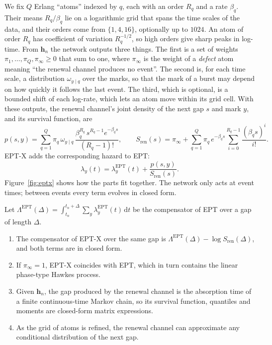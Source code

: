 We fix $Q$ Erlang ``atoms'' indexed by $q$, each with an order $R_q$ and a rate $\beta_q$. Their means
$R_q/\beta_q$ lie on a logarithmic grid that spans the time scales of the data, and their orders
come from $\{1,4,16\}$, optionally up to $1024$. An atom of order $R_q$ has coefficient of variation
$R_q^{-1/2}$, so high orders give sharp peaks in log-time. From $\bm h_n$ the network outputs
three things. The first is a set of weights $\pi_1,\dots,\pi_Q,\pi_\infty\ge0$ that sum to one,
where $\pi_\infty$ is the weight of a \emph{defect} atom meaning ``the renewal channel produces no
event''. The second is, for each time scale, a distribution $\omega_{y\mid q}$ over the marks, so
that the mark of a burst may depend on how quickly it follows the last event. The third, which is
optional, is a bounded shift of each log-rate, which lets an atom move within its grid cell. With
these outputs, the renewal channel's joint density of the next gap $s$ and mark $y$, and its survival function,
are
\begin{equation}\label{eq:renewal}
p(s,y)=\sum_{q=1}^{Q}\pi_q\,\omega_{y\mid q}\,
\frac{\beta_q^{R_q}\,s^{R_q-1}e^{-\beta_q s}}{(R_q-1)!},\qquad
S_{\mathrm{ren}}(s)=\pi_\infty+\sum_{q=1}^{Q}\pi_q\,e^{-\beta_q s}\sum_{i=0}^{R_q-1}\frac{(\beta_q s)^i}{i!}.
\end{equation}
EPT-X adds the corresponding hazard to EPT:
\[
\lambda_y(t)=\lambda^{\mathrm{EPT}}_y(t)+\frac{p(s,y)}{S_{\mathrm{ren}}(s)} .
\]
Figure~\ref{fig:eptx} shows how the parts fit together. The network only acts at event times;
between events every term evolves in closed form.
\begin{proposition}\label{prop:eptx}
Let $\Lambda^{\mathrm{EPT}}(\Delta)=\int_{t_n}^{t_n+\Delta}\sum_y\lambda^{\mathrm{EPT}}_y(t)\,\mathrm{d}t$
be the compensator of EPT over a gap of length $\Delta$.
\begin{enumerate}
\item The compensator of EPT-X over the same gap is $\Lambda^{\mathrm{EPT}}(\Delta)-\log S_{\mathrm{ren}}(\Delta)$,
and both terms are in closed form.
\item If $\pi_\infty=1$, EPT-X coincides with EPT, which in turn contains the linear phase-type
Hawkes process.
\item Given $\bm h_n$, the gap produced by the renewal channel is the absorption time of a finite
continuous-time Markov chain, so its survival function, quantiles and moments are closed-form
matrix expressions.
\item As the grid of atoms is refined, the renewal channel can approximate any conditional
distribution of the next gap.
\end{enumerate}
\end{proposition}

